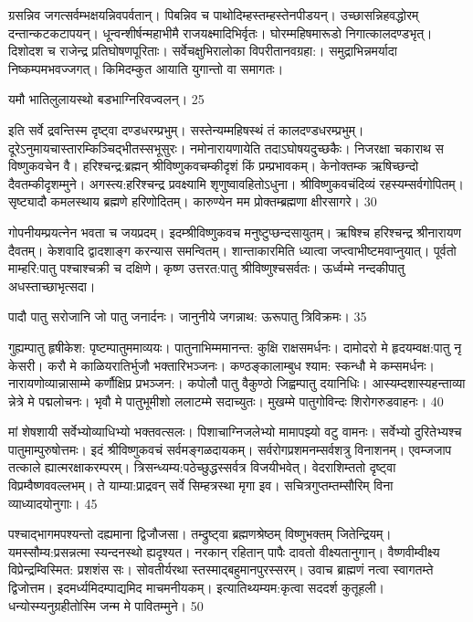   ग्रसन्निव जगत्सर्वम्भक्षयन्निवपर्वतान्।
 पिबन्निव च पाथोदिम्हस्तम्हस्तेनपीडयन्।
 उच्छासन्निहवद्धोरम् दन्तान्कटकटापयन्।
 धून्वन्शीर्षन्महाभीमै राजयक्ष्मादिभिर्वृतः।
 घोरम्महिषमारूडो निगात्कालदण्डभृत्।
 दिशोदश च राजेन्द्र प्रतिघोषणपूरिताः।
 सर्वेचक्षुभिरालोका विपरीतानवग्रहा:।
 समुद्राभिन्नमर्यादा निष्कम्पमभवज्जगत्।
 किमिदम्कुत आयाति युगान्तो वा समागतः।
 

यमौ भातिलुलायस्थो बडभाग्निरिवज्वलन्।
 25

  इति सर्वे द्रवन्तिस्म दृष्ट्वा दण्डधरम्प्रभुम्।
 सस्तेन्यम्महिषस्थं तं कालदण्डधरम्प्रभुम्।
 दूरेऽनुमायचास्तारम्किञ्चिद्भीतस्सभूसुरः।
 नमोनारायणायेति तदाऽघोषयदुच्छकैः।
 निजरक्षा चकाराथ स विष्णुकवचेन वै।
 हरिश्चन्द्र:ब्रह्मन् श्रीविष्णुकवचम्कीदृशं किं प्रम्प्रभावकम्।
 केनोक्तम्क ऋषिच्छन्दो दैवतम्कीदृशम्मुने।
 अगस्त्य:हरिश्चन्द्र प्रवक्ष्यामि शृणुष्वावहितोऽधुना।
 श्रीविष्णुकवचंदिव्यं रहस्यम्सर्वगोपितम्।
 सृष्ट्यादौ कमलस्थाय ब्रह्मणे हरिणोदितम्।
 कारुण्येन मम प्रोक्तम्ब्रह्मणा क्षीरसागरे।
 30

  गोपनीयम्प्रयत्नेन भवता च जयप्रदम्।
 इदम्श्रीविष्णुकवच मनुष्टुप्छन्दसायुतम्।
 ऋषिश्च हरिश्चन्द्र श्रीनारायण दैवतम्।
 केशवादि द्वादशाङ्ग करन्यास समन्वितम्।
 शान्ताकारमिति ध्यात्वा जप्त्वाभीष्टमवाप्नुयात्।
 पूर्वतो माम्हरि:पातु पश्चाश्चक्री च दक्षिणे।
 कृष्ण उत्तरत:पातु श्रीविष्णुश्चसर्वतः।
 ऊर्ध्वम्मे नन्दकीपातु अधस्ताच्छाभृत्सदा।
 
पादौ पातु सरोजानि जो पातु जनार्दनः।
 जानुनीये जगन्नाथ: ऊरूपातु त्रिविक्रमः।
 35

  गुह्यम्पातु हृषीकेश: पृष्टम्पातुममाव्ययः।
 पातुनाभिम्ममानन्त: कुक्षि राक्षसमर्धनः।
 दामोदरो मे हृदयम्वक्ष:पातु नृ केसरी।
 करौ मे काळियरातिर्भुजौ भक्तारिभञ्जनः।
 कण्ठङ्कालाम्बुध श्याम: स्कन्धौ मे कम्समर्धनः।
 नारायणोव्यान्नासाम्मे कर्णौक्षिप्र प्रभञ्जन:।
 कपोलौ पातु वैकुण्ठो जिह्वम्पातु दयानिधिः।
 आस्यम्दशास्यहन्ताव्या न्नेत्रे मे पद्मलोचनः।
 भृवौ मे पातुभूमीशो ललाटम्मे सदाच्युतः।
 मुखम्मे पातुगोविन्दः शिरोगरुडवाहनः।
 40

  मां शेषशायी सर्वेभ्योव्याधिभ्यो भक्तवत्सलः।
 पिशाचाग्निजलेभ्यो मामापझ्यो वटु वामनः।
 सर्वेभ्यो दुरितेभ्यश्च पातुमाम्पुरुषोत्तमः।
 इदं श्रीविष्णुकवचं सर्वमङ्गळदायकम्।
 सर्वरोगप्रशमनम्सर्वशत्रु विनाशनम्।
 एवम्जजाप तत्काले ह्यात्मरक्षाकरम्परम्।
 त्रिसन्ध्यम्य:पठेच्छुद्धस्सर्वत्र विजयीभवेत्।
 वेदराशिम्ततो दृष्ट्वा विप्रम्वैष्णववल्लभम्।
 ते याम्या:प्राद्रवन् सर्वे सिम्हत्रस्था मृगा इव।
 सचित्रगुप्तम्तम्सौरिम् विना व्याध्यादयोनुगाः।
 45

 
पश्चाद्भागमपश्यन्तो दह्यमाना द्विजौजसा।
 तम्द्रुष्ट्वा ब्रह्मणश्रेष्ठम् विष्णुभक्तम् जितेन्द्रियम्।
 यमस्सौम्य:प्रसन्नत्मा स्यन्दनस्थो ह्यदृश्यत।
 नरकान् रहितान् पापैः दावतो वीक्ष्यतानुगान्।
 वैष्णवीम्वीक्ष्य विप्रेन्द्रम्विस्मित: प्रशशंस सः।
 सोवतीर्यरथा स्तस्माद्बहुमानपुरस्सरम्।
 उवाच ब्राह्मणं नत्वा स्वागतम्ते द्विजोत्तम।
 इदमर्ध्यमिदम्पाद्यमिद माचमनीयकम्।
 इत्यातिथ्यम्यम:कृत्वा सददर्श कुतूहली।
 धन्योस्म्यनुग्रहीतोस्मि जन्म मे पावितम्मुने।
 50

